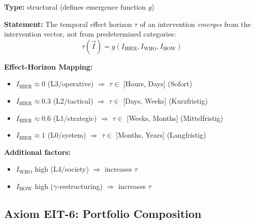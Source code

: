 \begin{tcolorbox}[colback=blue!5!white, colframe=blue!75!black,
    title=\textbf{Axiom EIT-5: Effect-Horizon Emergence}]

\textbf{Type:} structural (defines emergence function $g$)

\textbf{Statement:} The temporal effect horizon $\tau$ of an intervention \textit{emerges} from the intervention vector, not from predetermined categories:
\begin{equation}
\boxed{\tau(\vec{I}) = g(I_{\text{HIER}}, I_{\text{WHO}}, I_{\text{HOW}})}
\label{eq:ie-horizon-emergence}
\end{equation}

\textbf{Effect-Horizon Mapping:}
\begin{itemize}[nosep]
    \item $I_{\text{HIER}} \approx 0$ (L3/operative) $\Rightarrow$ $\tau \in$ [Hours, Days] (Sofort)
    \item $I_{\text{HIER}} \approx 0.3$ (L2/tactical) $\Rightarrow$ $\tau \in$ [Days, Weeks] (Kurzfristig)
    \item $I_{\text{HIER}} \approx 0.6$ (L1/strategic) $\Rightarrow$ $\tau \in$ [Weeks, Months] (Mittelfristig)
    \item $I_{\text{HIER}} \approx 1$ (L0/system) $\Rightarrow$ $\tau \in$ [Months, Years] (Langfristig)
\end{itemize}

\textbf{Additional factors:}
\begin{itemize}[nosep]
    \item $I_{\text{WHO}}$ high (L4/society) $\Rightarrow$ increases $\tau$
    \item $I_{\text{HOW}}$ high ($\gamma$-restructuring) $\Rightarrow$ increases $\tau$
\end{itemize}
\end{tcolorbox}

\subsection{Axiom EIT-6: Portfolio Composition}

